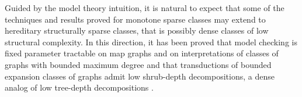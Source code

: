 Guided by the model theory intuition, it is natural to expect that some of the techniques and results proved for monotone sparse classes may extend to hereditary structurally sparse classes, that is possibly dense classes of low structural complexity. In this direction, it has been proved that model checking is fixed parameter tractable on map graphs \cite{eickmeyer2017fo} and on interpretations of classes of graphs with bounded maximum degree \cite{gajarsky2016new} and that transductions of bounded expansion classes of graphs admit low shrub-depth decompositions, a dense analog of low tree-depth decompositions \cite{gajarsky2018first}. 

